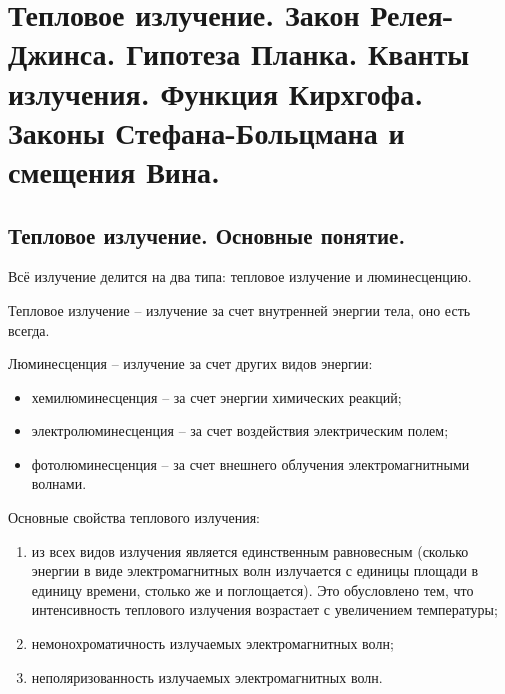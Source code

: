 \chapter{Тепловое излучение. Закон Релея-Джинса. Гипотеза Планка. 
Кванты излучения. Функция Кирхгофа. Законы Стефана-Больцмана и 
смещения Вина.}

\section{Тепловое излучение. Основные понятие.}
Всё излучение делится на два типа: тепловое излучение и люминесценцию.

Тепловое излучение -- излучение за счет внутренней энергии тела, оно есть
всегда.

Люминесценция -- излучение за счет других видов энергии:
\begin{itemize}
    \item хемилюминесценция -- за счет энергии химических реакций;
    \item электролюминесценция -- за счет воздействия электрическим полем;
    \item фотолюминесценция -- за счет внешнего облучения электромагнитными
        волнами.
\end{itemize}

Основные свойства теплового излучения:
\begin{enumerate}
    \item из всех видов излучения является единственным равновесным (сколько
        энергии в виде электромагнитных волн излучается с единицы площади
        в единицу времени, столько же и поглощается). Это обусловлено тем,
        что интенсивность теплового излучения возрастает с увеличением
        температуры;
    \item немонохроматичность излучаемых электромагнитных волн;
    \item неполяризованность излучаемых электромагнитных волн.
\end{enumerate}

